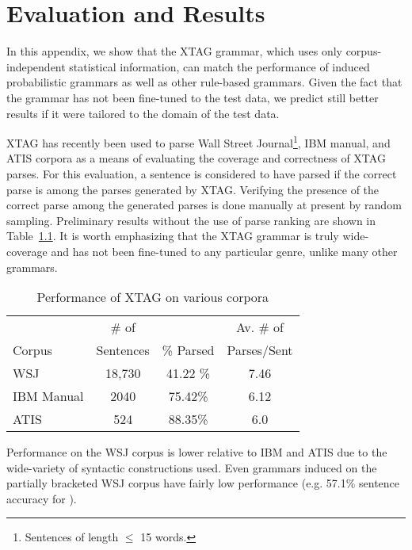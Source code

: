 \chapter{Evaluation and Results}
\label{evaluation}

In this appendix, we show that the XTAG grammar, which uses only
corpus-independent statistical information, can match the performance of
induced probabilistic grammars as well as other rule-based grammars.  Given the
fact that the grammar has not been fine-tuned to the test data, we predict
still better results if it were tailored to the domain of the test data.


XTAG has recently been used to parse Wall Street Journal\footnote{Sentences of
length $\leq$ 15 words.}, IBM manual, and ATIS corpora as a means of evaluating
the coverage and correctness of XTAG parses. For this evaluation, a sentence is
considered to have parsed if the correct parse is among the parses generated by
XTAG. Verifying the presence of the correct parse among the generated parses is
done manually at present by random sampling. Preliminary results without the
use of parse ranking are shown in Table~\ref{results}.  It is worth emphasizing
that the XTAG grammar is truly wide-coverage and has not been fine-tuned to any
particular genre, unlike many other grammars.

\begin{table}[ht]
\begin{center}
\begin{tabular}{|l|c|c|c|} \hline
& \# of & & Av. \# of\\
Corpus & Sentences & \% Parsed & Parses/Sent\\ \hline

WSJ & 18,730 & 41.22 \% & 7.46 \\\hline

IBM Manual & 2040 & 75.42\% & 6.12\\ \hline

ATIS & 524 & 88.35\% & 6.0 \\ \hline 
\end{tabular}
\end{center}

\vspace{0.1in}

\caption{Performance of XTAG on various corpora}
\label{results}
\end{table}

Performance on the WSJ corpus is lower relative to IBM and ATIS due
to the wide-variety of syntactic constructions used. Even grammars
induced on the partially bracketed WSJ corpus have fairly low
performance (e.g. 57.1\% sentence accuracy for \cite{schabes93}).  

